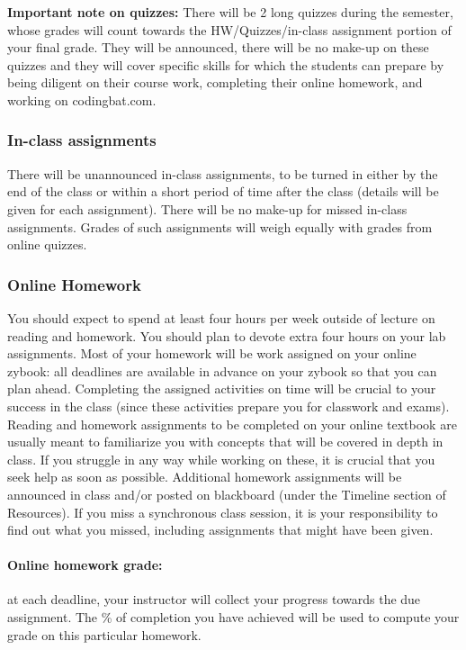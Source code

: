 \documentclass[12pt]{scrartcl}
\newcommand{\change}[2]{#2}
\begin{document}
\textbf{Important note on quizzes:} 
There will be 2 long quizzes during the semester, whose grades will count towards the HW/Quizzes/in-class assignment portion of your final grade. 
They will be announced, there will be no make-up on these quizzes and they will cover specific skills for which the students can prepare by being diligent on their course work, completing their online homework, and working on codingbat.com. 


\subsubsection{In-class assignments}
There will be unannounced in-class assignments, to be turned in either by the end of the class or within a short period of time after the class (details will be given for each assignment). 
There will be no make-up for missed in-class assignments. 
Grades of such assignments will weigh equally with grades from online quizzes. 

\subsubsection{Online Homework} 
You should expect to spend at least four hours per week outside of lecture on reading and homework. You should plan to devote extra four hours on your lab assignments. 
Most of your homework will be work assigned on your online zybook: 
all deadlines are available in advance on your zybook so that you can plan ahead. 
Completing the assigned activities on time will be crucial to your success in the class (since these activities prepare you for classwork and exams). 
Reading and homework assignments to be completed on your online textbook are usually meant to familiarize you with concepts that will be covered in depth in class. 
If you struggle in any way while working on these, it is crucial that you seek help as soon as possible.
\change{Reading and}{Additional} homework assignments will be announced in class and/or posted on blackboard (under the Timeline section of Resources).
If you miss a \change{lecture}{synchronous class} session, it is your responsibility to find out what you missed, including assignments that might have been given\change{ in class}.


\paragraph{Online homework grade:} at each deadline, your instructor will collect your progress towards the due assignment. 
The \% of completion you have achieved will be used to compute your grade on this particular homework. 
\end{document}
